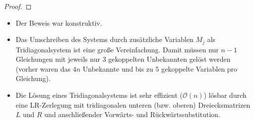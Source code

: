 \documentclass[11pt]{scrbook}
\begin{document}
\begin{st}
\begin{proof}
	\end{proof}
	\begin{note}
		\begin{itemize}
			\item
				Der Beweis war konstruktiv.
			\item
				Das Umschreiben des Systems durch zusätzliche Variablen $M_j$ als Tridiagonalsystem ist eine große Vereinfachung.
				Damit müssen nur $n-1$ Gleichungen mit jeweils nur $3$ gekoppelten Unbekannten gelöst werden (vorher waren das $4n$ Unbekannte und bis zu $5$ gekoppelte Variablen pro Gleichung).
			\item
				Die Lösung eines Tridiagonalsystems ist sehr effizient ($\mathcal O(n)$) lösbar durch eine LR-Zerlegung mit tridiagonalen unteren (bzw. oberen) Dreiecksmatrizen $L$ und $R$ und anschließender Vorwärts- und Rückwärtssubstitution.
		\end{itemize}
	\end{note}
\end{st}
\end{document}
